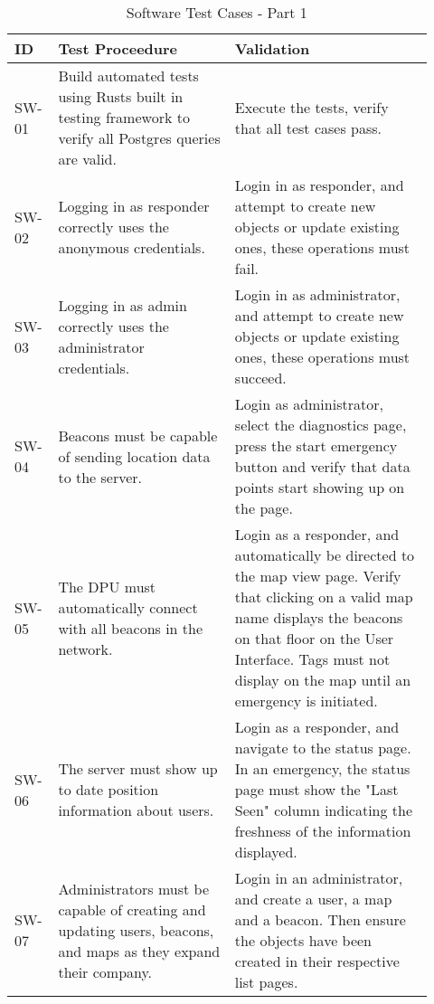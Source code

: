 \bigskip
\bgroup
\def\arraystretch{1.25}
\begin{table}[h!]
    \centering
    \begin{tabular}{|p{0.07\linewidth}|p{0.40\linewidth}|p{0.45\linewidth}|}
    \hline
    ID & Test Proceedure & Validation\\

    \hline
    SW-01
    & Build automated tests using Rusts built in testing framework to verify all Postgres queries are valid.
    & Execute the tests, verify that all test cases pass. \\

    \hline
    SW-02
    & Logging in as responder correctly uses the anonymous credentials.
    & Login in as responder, and attempt to create new objects or update existing ones, these operations must fail. \\

    \hline
    SW-03
    & Logging in as admin correctly uses the administrator credentials.
    & Login in as administrator, and attempt to create new objects or update existing ones, these operations must succeed. \\

    \hline
    SW-04
    & Beacons must be capable of sending location data to the server.
    & Login as administrator, select the diagnostics page, press the start emergency button and verify that data points start showing up on the page. \\

    \hline
    SW-05
    & The DPU must automatically connect with all beacons in the network.
    & Login as a responder, and automatically be directed to the map view page. Verify that clicking on a valid map name displays the beacons on that floor on the User Interface. Tags must not display on the map until an emergency is initiated. \\

    \hline
    SW-06
    & The server must show up to date position information about users.
    & Login as a responder, and navigate to the status page. In an emergency, the status page must show the "Last Seen" column indicating the freshness of the information displayed. \\

    \hline
    SW-07
    & Administrators must be capable of creating and updating users, beacons, and maps as they expand their company.
    & Login in an administrator, and create a user, a map and a beacon. Then ensure the objects have been created in their respective list pages. \\

    \hline
    \end{tabular}
    \caption{Software Test Cases - Part 1}
\end{table}

